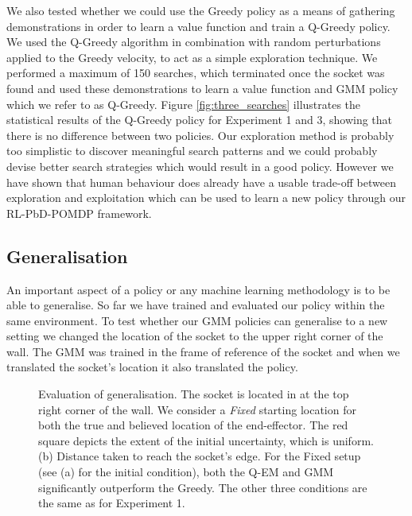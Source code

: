 \documentclass[final,3p,times,twocolumn]{elsarticle}
\begin{document}
We also tested whether we could use the Greedy policy as a means of gathering demonstrations in order to learn a value function and 
train a Q-Greedy policy. We used the Q-Greedy algorithm in combination with random perturbations applied to the Greedy velocity, to act as 
a simple exploration technique. We performed a maximum of 150 searches, which terminated once the socket was found and used these demonstrations to 
learn a value function and GMM policy which we refer to as Q-Greedy. Figure \ref{fig:three_searches} illustrates the statistical results 
of the Q-Greedy policy for Experiment 1 and 3, showing that there is no difference between two policies. 
Our exploration method is probably too simplistic to discover meaningful search patterns and we could probably devise better 
search strategies which would result in a good policy. However we have shown that human behaviour does already have a usable trade-off 
between exploration and exploitation which can be used to learn a new policy through our RL-PbD-POMDP framework.

\subsection{Generalisation}

An important aspect of a policy or any machine learning methodology is to be able to generalise. So far we have trained and 
evaluated our policy within the same environment. To test whether our GMM policies can generalise to a new setting we changed 
the location of the socket to the upper right corner of the wall. The GMM was trained in the frame of reference of the socket and
when we translated the socket's location it also translated the policy. 

\begin{figure}
 \centering
    \caption{Evaluation of generalisation. The socket is located in at the top right corner of the wall. We consider a 
    \textit{Fixed} starting location for both the true and believed location of the end-effector. The red square depicts the 
    extent of the initial uncertainty, which is uniform. (b) Distance taken to reach the socket's edge. For the Fixed setup (see (a) for 
    the initial condition), both the Q-EM and GMM significantly outperform the Greedy. The other three conditions are the same as for 
    Experiment 1. }
    \label{fig:experiment5_traj}
\end{figure}
\end{document}
